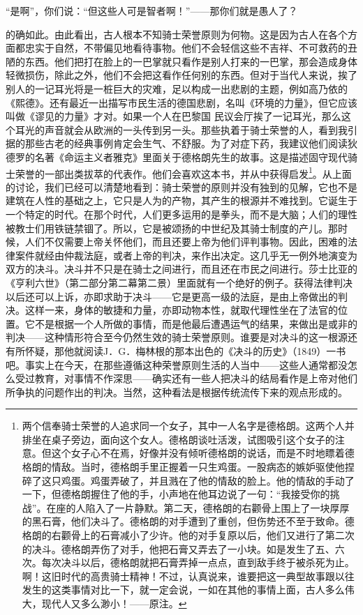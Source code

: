\documentclass[12pt,oneside]{book}
\begin{document}
“是啊”，你们说：“但这些人可是智者啊！”——那你们就是愚人了？ 

的确如此。由此看出，古人根本不知骑士荣誉原则为何物。这是因为古人在各个方面都忠实于自然，不带偏见地看待事物。他们不会轻信这些不吉祥、不可救药的丑陋的东西。他们把打在脸上的一巴掌就只看作是别人打来的一巴掌，那会造成身体轻微损伤，除此之外，他们不会把这看作任何别的东西。但对于当代人来说，挨了别人的一记耳光将是一桩巨大的灾难，足以构成一出悲剧的主题，例如高乃依的《熙德》。还有最近一出描写市民生活的德国悲剧，名叫《环境的力量》，但它应该叫做《谬见的力量》才对。如果一个人在巴黎国
民议会厅挨了一记耳光，那么这个耳光的声音就会从欧洲的一头传到另一头。那些执着于骑士荣誉的人，看到我引据的那些古老的经典事例肯定会生气、不舒服。为了对症下药，我建议他们阅读狄德罗的名著《命运主义者雅克》里面关于德格朗先生的故事。这是描述固守现代骑士荣誉的一部出类拔萃的代表作。他们会喜欢这本书，并从中获得启发\footnote{两个信奉骑士荣誉的人追求同一个女子，其中一人名字是德格朗。这两个人并排坐在桌子旁边，面向这个女人。德格朗谈吐活泼，试图吸引这个女子的注意。但这个女子心不在焉，好像并没有倾听德格朗的说话，而是不时地瞟着德格朗的情敌。当时，德格朗手里正握着一只生鸡蛋。一股病态的嫉妒驱使他捏碎了这只鸡蛋。鸡蛋弄破了，并且溅在了他的情敌的脸上。他的情敌的手动了一下，但德格朗握住了他的手，小声地在他耳边说了一句：“我接受你的挑战”。在座的人陷入了一片静默。第二天，德格朗的右颧骨上围上了一块厚厚的黑石膏，他们决斗了。德格朗的对手遭到了重创，但伤势还不至于致命。德格朗的右颧骨上的石膏减小了少许。他的对手复原以后，他们又进行了第二次的决斗。德格朗弄伤了对手，他把石膏又弄去了一小块。如是发生了五、六次。每次决斗以后，德格朗就把石膏弄掉一点点，直到敌手终于被杀死为止。啊！这旧时代的高贵骑士精神！不过，认真说来，谁要把这一典型故事跟以往发生的这类事情对比一下，就一定会说，一如在其他的事情上面，古人多么伟大，现代人又多么渺小！——原注。}。从上面的讨论，我们已经可以清楚地看到：骑士荣誉的原则并没有独到的见解，它也不是建筑在人性的基础之上，它只是人为的产物，其产生的根源并不难找到。它诞生于一个特定的时代。在那个时代，人们更多运用的是拳头，而不是大脑；人们的理性被教士们用铁链禁锢了。所以，它是被颂扬的中世纪及其骑士制度的产儿。那时候，人们不仅需要上帝关怀他们，而且还要上帝为他们评判事物。因此，困难的法律案件就经由仲裁法庭，或者上帝的判决，来作出决定。这几乎无一例外地演变为双方的决斗。决斗并不只是在骑士之间进行，而且还在市民之间进行。莎士比亚的《亨利六世》（第二部分第二幕第二景）里面就有一个绝好的例子。获得法律判决以后还可以上诉，亦即求助于决斗——它是更高一级的法庭，是由上帝做出的判决。这样一来，身体的敏捷和力量，亦即动物本性，就取代理性坐在了法官的位置。它不是根据一个人所做的事情，而是他最后遭遇运气的结果，来做出是或非的判决——这种情形符合至今仍然生效的骑士荣誉原则。谁要是对决斗的这一根源还有所怀疑，那他就阅读J．G．梅林根的那本出色的《决斗的历史》（1849）一书吧。事实上在今天，在那些遵循这种荣誉原则生活的人当中——这些人通常都没怎么受过教育，对事情不作深思——确实还有一些人把决斗的结局看作是上帝对他们所争执的问题作出的判决。当然，这种看法是根据传统流传下来的观点形成的。 
\end{document}
